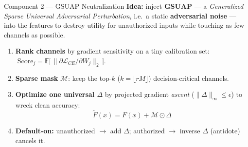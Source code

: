 \documentclass{beamer}
\newcommand{\smallgap}{\vspace{0.15cm}}
\begin{document}
\begin{frame}{Component 2 --- GSUAP Neutralization}
    \textbf{Idea:} inject \textbf{GSUAP} --- a \emph{Generalized Sparse Universal Adversarial Perturbation}, i.e.\ a static \textbf{adversarial noise} --- into the features to destroy utility for unauthorized inputs while touching as few channels as possible.
    \smallgap
    \begin{enumerate}\small
        \item \textbf{Rank channels} by gradient sensitivity on a tiny calibration set:
        $\;\text{Score}_j=\mathbb{E}\big[\,\|\partial \mathcal{L}_{CE}/\partial W_j\|_2\,\big]$.
        \item \textbf{Sparse mask} $\mathcal{M}$: keep the top-$k$ ($k=\lfloor rM\rfloor$) decision-critical channels.
        \item \textbf{Optimize one universal $\Delta$} by projected gradient \emph{ascent} ($\|\Delta\|_\infty\le\epsilon$) to wreck clean accuracy:
        \[ \widetilde{F}(x) = F(x) + \mathcal{M} \odot \Delta \]
        \item \textbf{Default-on:} unauthorized $\to$ add $\Delta$; authorized $\to$ inverse $\Delta$ (antidote) cancels it.
    \end{enumerate}
    \vspace{0.05cm}

\end{frame}
\end{document}
